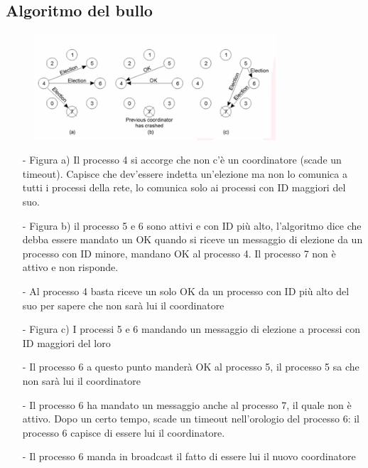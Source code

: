 \documentclass[12pt,italian]{report}
\begin{document}
\subsection{Algoritmo del bullo}
\begin{figure}[h]
\centering
\includegraphics[width=90mm]{img/bullo.png}
\end{figure}
\begin{enumerate}
    \item[-] Figura a) Il processo 4 si accorge che non c'è un coordinatore (scade un timeout). Capisce che dev'essere indetta un'elezione ma non lo comunica a tutti i processi della rete, lo comunica solo ai processi con ID maggiori del suo. 
    \item[-] Figura b) il processo 5 e 6 sono attivi e con ID più alto, l'algoritmo dice che debba essere mandato un OK quando si riceve un messaggio di elezione da un processo con ID minore, mandano OK al processo 4. Il processo 7 non è attivo e non risponde. 
    \item[-] Al processo 4 basta riceve un solo OK da un processo con ID più alto del suo per sapere che non sarà lui il coordinatore
    \item[-] Figura c) I processi 5 e 6 mandando un messaggio di elezione a processi con ID maggiori del loro
    \item[-] Il processo 6 a questo punto manderà OK al processo 5, il processo 5 sa che non sarà lui il coordinatore
    \item[-] Il processo 6 ha mandato un messaggio anche al processo 7, il quale non è attivo. Dopo un certo tempo, scade un timeout nell'orologio del processo 6: il processo 6 capisce di essere lui il coordinatore.
    \item[-] Il processo 6 manda in broadcast il fatto di essere lui il nuovo coordinatore
\end{enumerate}
\end{document}
